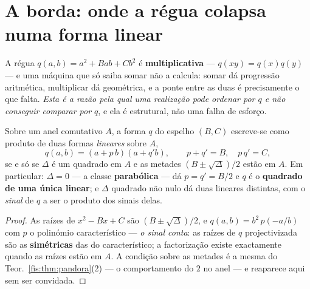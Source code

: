 \documentclass[livro.tex]{subfiles}
\begin{document}

\section{A borda: onde a régua colapsa numa forma linear}\label{fis:borda}

\noindent A régua $q(a,b)=a^{2}+Bab+Cb^{2}$ é \textbf{multiplicativa} ---
$q(xy)=q(x)q(y)$ --- e uma máquina que só saiba somar não a calcula: somar dá
progressão aritmética, multiplicar dá geométrica, e a ponte entre as duas é
precisamente o que falta. \emph{Esta é a razão pela qual uma realização pode
ordenar por $q$ e não conseguir comparar por $q$}, e ela é estrutural, não uma
falha de esforço.

\begin{corolario}\label{fis:cor:borda}
Sobre um anel comutativo $A$, a forma $q$ do espelho $(B,C)$ escreve-se como
produto de duas formas \emph{lineares} sobre $A$,
\[
q(a,b)=(a+p\,b)(a+q'b),\qquad p+q'=B,\quad p\,q'=C ,
\]
se e só se $\Delta$ é um quadrado em $A$ e as metades $(B\pm\sqrt{\Delta})/2$
estão em $A$. Em particular: $\Delta=0$ --- a classe \textbf{parabólica} --- dá
$p=q'=B/2$ e $q$ é o \textbf{quadrado de uma única linear}; e $\Delta$ quadrado
não nulo dá duas lineares distintas, com o \emph{sinal} de $q$ a ser o produto
dos sinais delas.
\end{corolario}

\begin{proof}
As raízes de $x^{2}-Bx+C$ são $(B\pm\sqrt{\Delta})/2$, e
$q(a,b)=b^{2}\,p(-a/b)$ com $p$ o polinómio característico --- \emph{o sinal
conta}: as raízes de $q$ projectivizada são as \textbf{simétricas} das do
característico; a factorização existe exactamente quando as raízes estão em $A$. A condição sobre as metades é a mesma
do Teor.~\ref{fis:thm:pandora}(2) --- o comportamento do $2$ no anel --- e
reaparece aqui sem ser convidada.
\end{proof}
\end{document}
